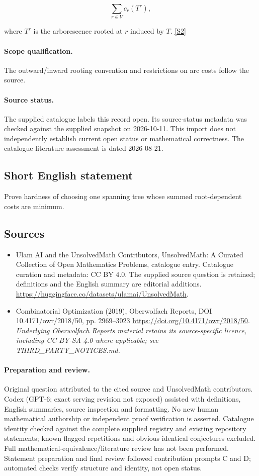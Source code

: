 \documentclass[11pt]{article}
\begin{document}
$$\sum_{r\in V}c_r(T^r),$$

where $T^r$ is the arborescence rooted at $r$ induced by $T$. \href{https://doi.org/10.4171/owr/2018/50}{[S2]}
\paragraph{Scope qualification.}
The outward/inward rooting convention and restrictions on arc costs follow the source.
\paragraph{Source status.}
The supplied catalogue labels this record open. Its source-status metadata was checked against the supplied snapshot on 2026-10-11. This import does not independently establish current open status or mathematical correctness. The catalogue literature assessment is dated 2026-08-21.
\subsection{Short English statement}
Prove hardness of choosing one spanning tree whose summed root-dependent costs are minimum.
\subsection{Sources}
\begin{itemize}
\item[S1] Ulam AI and the UnsolvedMath Contributors, UnsolvedMath: A Curated Collection of Open Mathematics Problems, catalogue entry. Catalogue curation and metadata: CC BY 4.0. The supplied source question is retained; definitions and the English summary are editorial additions.
\url{https://huggingface.co/datasets/ulamai/UnsolvedMath}.
\item[S2] Combinatorial Optimization (2019), Oberwolfach Reports, DOI 10.4171/owr/2018/50, pp. 2969--3023
\url{https://doi.org/10.4171/owr/2018/50}.
\textit{Underlying Oberwolfach Reports material retains its source-specific licence, including CC BY-SA 4.0 where applicable; see THIRD\_PARTY\_NOTICES.md.}
\end{itemize}
\paragraph{Preparation and review.}
Original question attributed to the cited source and UnsolvedMath contributors. Codex (GPT-6; exact serving revision not exposed) assisted with definitions, English summaries, source inspection and formatting. No new human mathematical authorship or independent proof verification is asserted. Catalogue identity checked against the complete supplied registry and existing repository statements; known flagged repetitions and obvious identical conjectures excluded. Full mathematical-equivalence/literature review has not been performed. Statement preparation and final review followed contribution prompts C and D; automated checks verify structure and identity, not open status.
\label{end:statement}
\end{document}
